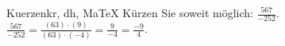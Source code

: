 \begin{MAufgabe}{Kuerzen}{kr, dh, MaTeX}
K\"urzen Sie soweit m\"oglich: $\frac{567}{-252}$.\\ 
\ifLsg\MLoesung
\quad $\frac{567}{-252}=\frac{(63)\cdot(9)}{(63)\cdot(-4)}=\frac{9}{-4}=\frac{-9}{4}$.\else\relax\fi
 \end{MAufgabe}